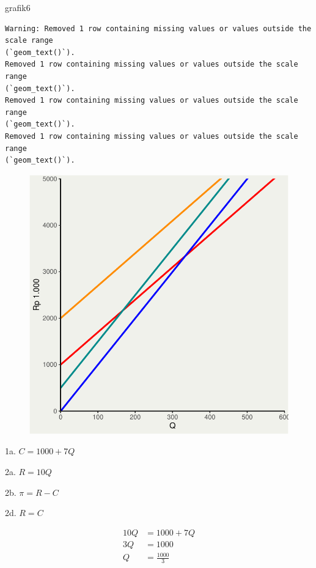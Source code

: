 \documentclass[
  letterpaper,
  DIV=11,
  numbers=noendperiod]{scrartcl}
\newenvironment{Shaded}{\begin{snugshade}}{\end{snugshade}}
\newcommand{\NormalTok}[1]{\textcolor[rgb]{0.00,0.23,0.31}{#1}}
\begin{document}
\begin{Shaded}
\begin{Highlighting}[]
\NormalTok{grafik6}
\end{Highlighting}
\end{Shaded}

\begin{verbatim}
Warning: Removed 1 row containing missing values or values outside the scale range
(`geom_text()`).
Removed 1 row containing missing values or values outside the scale range
(`geom_text()`).
Removed 1 row containing missing values or values outside the scale range
(`geom_text()`).
Removed 1 row containing missing values or values outside the scale range
(`geom_text()`).
\end{verbatim}

\begin{figure}[H]

{\centering \includegraphics{index_files/figure-pdf/unnamed-chunk-8-1.pdf}

}

\end{figure}

1a. \(C=1000+7Q\)

2a. \(R=10Q\)

2b. \(\pi=R-C\)

2d. \(R=C\)

\[
\begin{align}
10Q&=1000+7Q \\
3Q&=1000 \\
Q&=\frac{1000}{3}
\end{align}
\]
\end{document}

